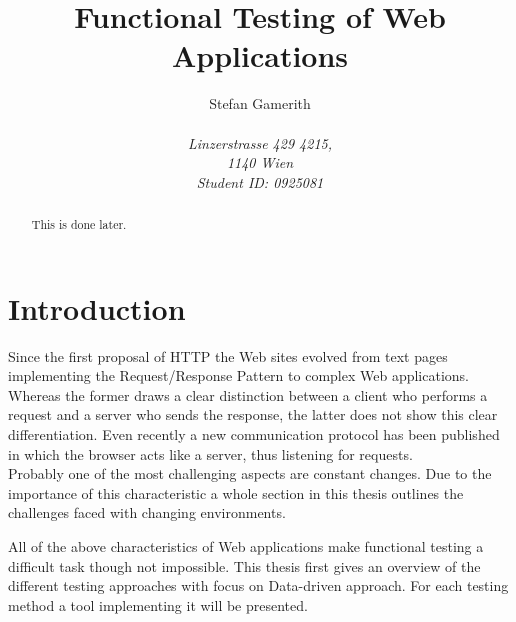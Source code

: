 \documentclass[12pt, notitlepage]{article}
\title{Functional Testing of Web Applications}
\author{Stefan Gamerith\\\\
		\emph{Linzerstrasse 429 4215,}\\
		\emph{1140 Wien}\\
		\emph{Student ID: 0925081}}
\begin{document}
	\maketitle
	
	\begin{abstract}
		This is done later.
	\end{abstract}
	
	\tableofcontents
	
\section*{Introduction}
Since the first proposal of HTTP\cite{http-proposal} the Web sites evolved from 
text pages implementing the Request/Response Pattern\cite{request-response}  to  
complex Web applications. Whereas the former draws a clear distinction between a client
who performs a request and a server who sends the response, the latter does not show this 
clear differentiation. Even recently a new communication protocol\cite{web-socket} has been published 
in which the browser acts like a server, thus listening for requests. \\
 
Probably one of the most challenging aspects are constant changes.%
Due to the importance of this characteristic a whole section in this thesis outlines the challenges faced
with changing environments. 



All of the above characteristics of Web applications make functional testing a difficult task though not impossible.
This thesis first gives an overview of the different testing approaches with focus on Data-driven approach. For each 
testing method a tool implementing it will be presented. 
\end{document}
